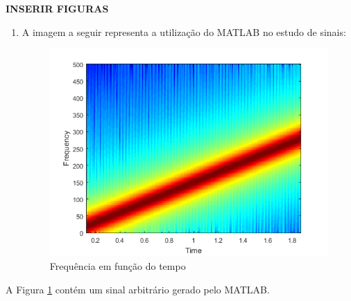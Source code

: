 \documentclass[12pt,a4paper]{article}
\begin{document}
    \textbf{INSERIR FIGURAS}
    
    \begin{enumerate}
        \item A imagem a seguir representa a utilização do MATLAB no estudo de sinais:
        
        \begin{figure}[htb]
            \centering
            \includegraphics[scale=1]{sinal.png}
            \caption{Frequência em função do tempo}
            \label{fig:sinal}
        \end{figure}
    \end{enumerate}

    A Figura \ref{fig:sinal} contém um sinal arbitrário gerado pelo MATLAB. 
    
    
    
\end{document}
